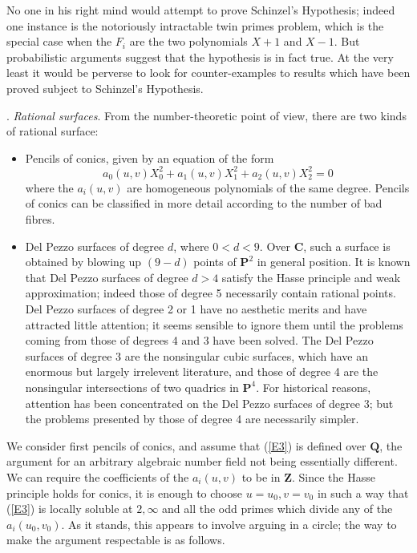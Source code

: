 \documentclass[12pt]{article}
\def\bC{{\mathbf C}}
\def\bP{{\mathbf P}}
\def\bQ{{\mathbf Q}}
\def\bZ{{\mathbf Z}}
\def\beq{\begin{equation} \label}
\begin{document}
No one in his right mind would attempt to prove Schinzel's Hypothesis; indeed
one instance is the notoriously intractable twin primes problem,
which is the special case when the $F_i$ are the two polynomials $X+1$ and
$X-1$. But probabilistic arguments suggest that the hypothesis is in fact
true. At the very least it would be perverse to look for counter-examples to
results which have been proved subject to Schinzel's Hypothesis.

\bigskip

. \emph{Rational surfaces}. \newline
From the number-theoretic point of view, there are two kinds of rational
surface:
\begin{itemize}
\item Pencils of conics, given by an equation of the form
\beq{E3} a_0(u,v)X_0^2+a_1(u,v)X_1^2+a_2(u,v)X_2^2=0 \end{equation}
where the $a_i(u,v)$ are homogeneous polynomials of the same degree. Pencils
of conics can
be classified in more detail according to the number of bad fibres.
\item Del Pezzo surfaces of degree $d$, where $0<d<9$. Over $\bC$, such a
surface is obtained by blowing up $(9-d)$ points of $\bP^2$ in general
position. It is known that Del Pezzo surfaces of degree $d>4$ satisfy the
Hasse principle and weak approximation; indeed those of degree 5 necessarily
contain rational points. Del Pezzo surfaces of degree 2 or 1
have no aesthetic
merits and have attracted little attention; it seems sensible to ignore
them until the problems coming from those of degrees 4 and 3 have been solved.
The Del Pezzo surfaces of degree 3 are the nonsingular cubic
surfaces, which have an enormous but largely irrelevent literature,
and those of degree 4 are the nonsingular intersections of
two quadrics in $\bP^4$. For historical reasons, attention has been
concentrated on the Del Pezzo
surfaces of degree 3; but the problems presented by those
of degree 4 are necessarily simpler.
\end{itemize}

\medskip

We consider first pencils of conics, and assume that (\ref{E3}) is defined
over $\bQ$, the argument for an arbitrary algebraic number field not being
essentially different. We can require the coefficients of the
$a_i(u,v)$ to be in $\bZ$. Since the Hasse principle holds for conics, it is
enough to choose $u=u_0,v=v_0$ in such a way that (\ref{E3}) is locally
soluble at $2,\infty$ and all the odd primes which divide any of the
$a_i(u_0,v_0)$. As it stands, this appears to involve arguing in a circle;
the way to make the argument respectable is as follows.
\end{document}
